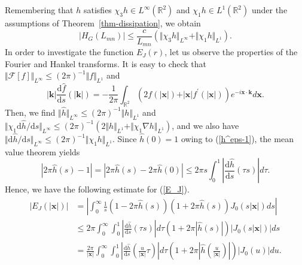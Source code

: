 \documentclass{article}
\theoremstyle{definition}
\begin{document}
Remembering that $h$ satisfies $\chi_3 h \in L^\infty(\mathbb{R}^2)$ and $\chi_1 h \in L^1(\mathbb{R}^2)$ under the assumptions of Theorem~\ref{thm-dissipation}, we obtain
\begin{equation*}
\left\vert H_G(L_{mn}) \right\vert \leq \frac{c}{L_{mn}} \left( \Vert \chi_3 h \Vert_{L^\infty} + \Vert \chi_1 h \Vert_{L^1} \right).
\end{equation*}
In order to investigate the function $E_J(r)$, let us observe the properties of the Fourier and Hankel transforms. It is easy to check that $\Vert \mathscr{F}[f] \Vert_{L^\infty} \leq (2 \pi)^{-1} \Vert f \Vert_{L^1}$ and 
\begin{equation*}
\vert {\bm k} \vert \frac{\mbox{d} \widehat{f}}{\mbox{d}s}( \vert {\bm k}\vert) = - \frac{1}{2 \pi}\int_{\mathbb{R}^2} \left( 2 f(\vert{\bm x}\vert) + \vert{\bm x}\vert f^\prime(\vert{\bm x}\vert) \right) e^{- i {\bm x} \cdot {\bm k}} d{\bm x}.
\end{equation*}
Then, we find $\Vert\widehat{h}\Vert_{L^\infty} \leq (2 \pi)^{-1} \Vert h \Vert_{L^1}$ and $\Vert \chi_1 \mbox{d}\widehat{h}/\mbox{d}s \Vert_{L^\infty} \leq (2 \pi)^{-1} ( 2 \Vert h \Vert_{L^1} + \Vert \chi_1 \nabla h \Vert_{L^1})$, and we also have $\Vert \mbox{d}\widehat{h}/\mbox{d}s \Vert_{L^\infty} \leq (2 \pi)^{-1} \Vert \chi_1 h \Vert_{L^1}$. Since $\widehat{h}(0)=1$ owing to (\ref{h^eps-1}), the mean value theorem yields
\begin{equation*}
\left\vert 2 \pi \widehat{h}(s) - 1 \right\vert = \left\vert 2 \pi \widehat{h}(s) - 2\pi\widehat{h}(0) \right\vert \leq 2 \pi s \int_0^1 \left\vert \frac{\mbox{d}\widehat{h}}{\mbox{d}s}(\tau s) \right\vert d\tau.
\end{equation*}
Hence, we have the following estimate for (\ref{E_J}).
\begin{align*}
\left\vert E_J(\vert{\bm x}\vert) \right\vert &= \left\vert\int_0^\infty \frac{1}{s} \left( 1 - 2\pi\widehat{h}(s) \right)\left( 1 + 2\pi\widehat{h}(s) \right) J_0 \left( s \vert{\bm x}\vert \right) ds \right\vert \\
&\leq 2 \pi \int_0^\infty  \int_0^1 \left\vert \frac{\mbox{d}\widehat{h}}{\mbox{d}s}(\tau s) \right\vert d\tau \left( 1 + 2\pi\left\vert \widehat{h}(s) \right\vert \right) \left\vert J_0 \left( s \vert{\bm x}\vert \right) \right\vert ds \\
&=  \frac{2 \pi}{\vert{\bm x}\vert} \int_0^\infty  \int_0^1 \left\vert \frac{\mbox{d}\widehat{h}}{\mbox{d}s}\left( \frac{u}{\vert{\bm x}\vert}\tau \right) \right\vert d\tau \left( 1 + 2\pi\left\vert \widehat{h}\left( \frac{u}{\vert{\bm x}\vert} \right) \right\vert \right) \left\vert J_0 \left( u \right) \right\vert du.
\end{align*}
\end{document}
